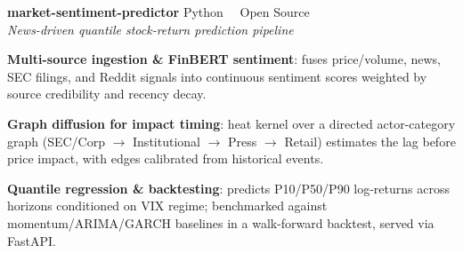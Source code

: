 \documentclass[10pt,letterpaper]{article}
\newcommand{\subhead}[1]{{\bfseries\color{darktext}\fontsize{9.5}{12}\selectfont #1}}
\begin{document}
\begin{lrbox}{\maincolbox}
\begin{minipage}[t]{5.55in}
\begin{minipage}[t]{5.05in}
\vspace{10pt}
\subhead{market-sentiment-predictor} \hfill {\fontsize{8.5}{10}\selectfont\color{midgray} Python \ \textbullet\ Open Source}\\
{\fontsize{8.7}{11.5}\selectfont\color{midgray}\textit{News-driven quantile stock-return prediction pipeline}}
\begin{tightlist}
\item {\fontsize{8.8}{12.3}\selectfont\color{darktext} \textbf{Multi-source ingestion \& FinBERT sentiment}: fuses price/volume, news, SEC filings, and Reddit signals into continuous sentiment scores weighted by source credibility and recency decay.}
\item {\fontsize{8.8}{12.3}\selectfont\color{darktext} \textbf{Graph diffusion for impact timing}: heat kernel over a directed actor-category graph (SEC/Corp $\to$ Institutional $\to$ Press $\to$ Retail) estimates the lag before price impact, with edges calibrated from historical events.}
\item {\fontsize{8.8}{12.3}\selectfont\color{darktext} \textbf{Quantile regression \& backtesting}: predicts P10/P50/P90 log-returns across horizons conditioned on VIX regime; benchmarked against momentum/ARIMA/GARCH baselines in a walk-forward backtest, served via FastAPI.}
\end{tightlist}

\end{minipage}
\end{minipage}
\end{lrbox}

\settoheight{\maincolht}{\usebox{\maincolbox}}
\addtolength{\maincolht}{\dp\maincolbox}

\newsavebox{\sidebarbox}
\newlength{\sidebarht}
\end{document}
